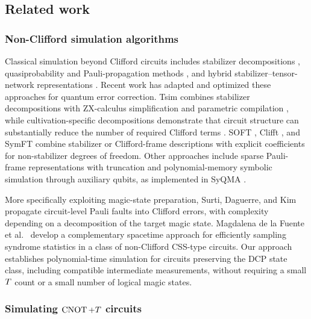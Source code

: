 \subsection{Related work}

\subsubsection{Non-Clifford simulation algorithms}

Classical simulation beyond Clifford circuits includes stabilizer decompositions \cite{bravyi2016improved,bravyi2019simulation}, quasiprobability and Pauli-propagation methods \cite{pashayan2015estimating,rall2019simulation}, and hybrid stabilizer--tensor-network representations \cite{masot-llima2024stabilizer,nakhl2025stabilizer}.
Recent work has adapted and optimized these approaches for quantum error correction.
Tsim \cite{haenel2026tsim} combines stabilizer decompositions with ZX-calculus simplification and parametric compilation \cite{kissinger2022classical,sutcliffe2025fast}, while cultivation-specific decompositions demonstrate that circuit structure can substantially reduce the number of required Clifford terms \cite{wan2025cutting,wan2026simulating}.
SOFT \cite{li2025soft}, Clifft \cite{chase2026clifft}, and SymFT \cite{fang2026symft} combine stabilizer or Clifford-frame descriptions with explicit coefficients for non-stabilizer degrees of freedom.
Other approaches include sparse Pauli-frame representations with truncation \cite{tuloup2026computing} and polynomial-memory symbolic simulation through auxiliary qubits, as implemented in SyQMA \cite{umbrarescu2026syqma}.

More specifically exploiting magic-state preparation, Surti, Daguerre, and Kim \cite{surti2026efficient} propagate circuit-level Pauli faults into Clifford errors, with complexity depending on a decomposition of the target magic state.
Magdalena de la Fuente et al.~\cite{fuente2026highthreshold} develop a complementary spacetime approach for efficiently sampling syndrome statistics in a class of non-Clifford CSS-type circuits.
Our approach establishes polynomial-time simulation for circuits preserving the DCP state class, including compatible intermediate measurements, without requiring a small $T$ count or a small number of logical magic states.

\subsubsection{Simulating \texorpdfstring{$\operatorname{CNOT}+T$}{CNOT+T} circuits}

